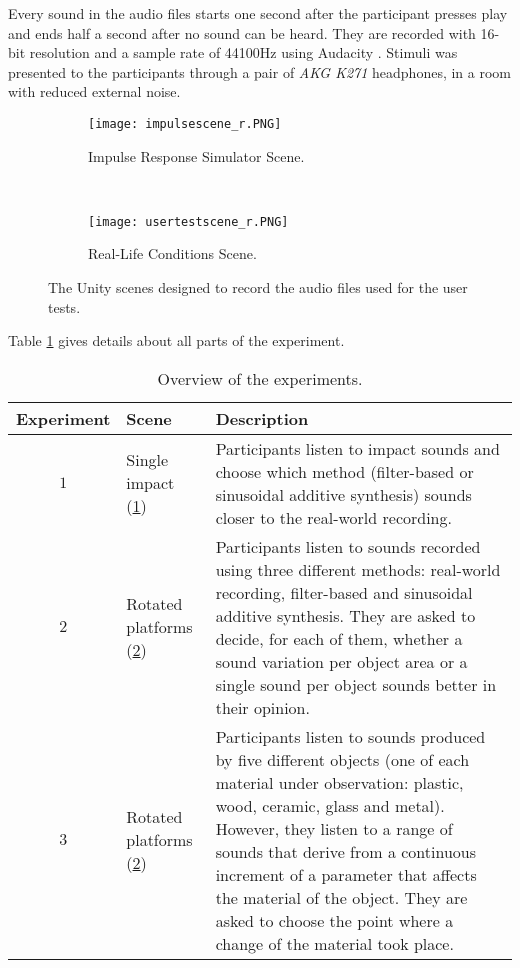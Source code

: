 Every sound in the audio files starts one second after the participant presses play and ends half a second after no sound can be heard. They are recorded with 16-bit resolution and a sample rate of 44100Hz using Audacity\textsuperscript{\textregistered} \cite{bib:audacity}. Stimuli was presented to the participants through a pair of \textit{AKG K271} headphones, in a room with reduced external noise.

\begin{figure}[H]
    \centering
    \begin{subfigure}[b]{0.48\textwidth}
        \texttt{[image: impulsescene\_r.PNG]}
        \caption{Impulse Response Simulator Scene.}
        \label{fig:test_sc1}
    \end{subfigure}
    ~ %
    \begin{subfigure}[b]{0.48\textwidth}
        \texttt{[image: usertestscene\_r.PNG]}
        \caption{Real-Life Conditions Scene.}
        \label{fig:test_sc2}
    \end{subfigure}
    \caption{The Unity\textsuperscript{\textregistered} scenes designed to record the audio files used for the user tests.}\label{fig:test_scenes}
\end{figure}

Table \ref{tab:test_dec} gives details about all parts of the experiment.

\begin{table}[H]
	\centering
    \begin{tabular}{ c  l  p{7cm}  }
    \toprule
    \textbf{Experiment} & \textbf{Scene} & \textbf{Description} \\ \toprule
    \addlinespace
    $1$ & Single impact (\ref{fig:test_sc1}) & Participants listen to impact sounds and choose which method (filter-based or sinusoidal additive synthesis) sounds closer to the real-world recording.  \\
    \addlinespace
    $2$ & Rotated platforms (\ref{fig:test_sc2}) & Participants listen to sounds recorded using three different methods: real-world recording, filter-based and sinusoidal additive synthesis. They are asked to decide, for each of them, whether a sound variation per object area or a single sound per object sounds better in their opinion.  \\
    \addlinespace
    $3$ & Rotated platforms (\ref{fig:test_sc2}) & Participants listen to sounds produced by five different objects (one of each material under observation: plastic, wood, ceramic, glass and metal). However, they listen to a range of sounds that derive from a continuous increment of a parameter that affects the material of the object. They are asked to choose the point where a change of the material took place. \\ 
    \bottomrule
    \end{tabular}
    \caption{Overview of the experiments.}
    \label{tab:test_dec}
\end{table} 

